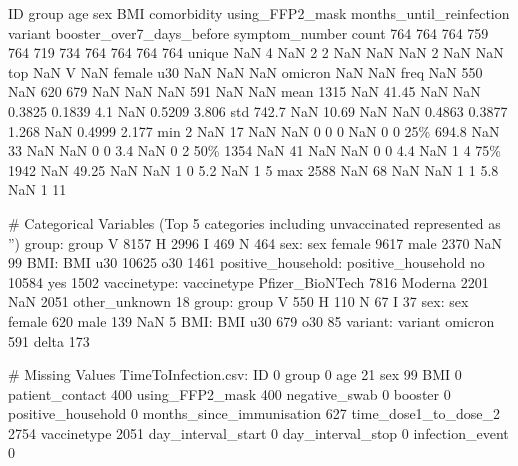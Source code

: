 \documentclass[11pt]{article}
\begin{document}
\begin{codeoutput}
          ID group   age     sex  BMI  comorbidity  using\_FFP2\_mask  months\_until\_reinfection  variant  booster\_over7\_days\_before  symptom\_number
count    764   764   764     759  764          719              734                       764      764                        764             764
unique   NaN     4   NaN       2    2          NaN              NaN                       NaN        2                        NaN             NaN
top      NaN     V   NaN  female  u30          NaN              NaN                       NaN  omicron                        NaN             NaN
freq     NaN   550   NaN     620  679          NaN              NaN                       NaN      591                        NaN             NaN
mean    1315   NaN 41.45     NaN  NaN       0.3825           0.1839                       4.1      NaN                     0.5209           3.806
std    742.7   NaN 10.69     NaN  NaN       0.4863           0.3877                     1.268      NaN                     0.4999           2.177
min        2   NaN    17     NaN  NaN            0                0                         0      NaN                          0               0
25\%    694.8   NaN    33     NaN  NaN            0                0                       3.4      NaN                          0               2
50\%     1354   NaN    41     NaN  NaN            0                0                       4.4      NaN                          1               4
75\%     1942   NaN 49.25     NaN  NaN            1                0                       5.2      NaN                          1               5
max     2588   NaN    68     NaN  NaN            1                1                       5.8      NaN                          1              11

\# Categorical Variables (Top 5 categories including unvaccinated represented as '')
group: group
V    8157
H    2996
I     469
N     464
sex: sex
female    9617
male      2370
NaN         99
BMI: BMI
u30    10625
o30     1461
positive\_household: positive\_household
no     10584
yes     1502
vaccinetype: vaccinetype
Pfizer\_BioNTech    7816
Moderna            2201
NaN                2051
other\_unknown        18
group: group
V    550
H    110
N     67
I     37
sex: sex
female    620
male      139
NaN         5
BMI: BMI
u30    679
o30     85
variant: variant
omicron    591
delta      173

\# Missing Values
TimeToInfection.csv: ID                              0
group                           0
age                            21
sex                            99
BMI                             0
patient\_contact               400
using\_FFP2\_mask               400
negative\_swab                   0
booster                         0
positive\_household              0
months\_since\_immunisation     627
time\_dose1\_to\_dose\_2         2754
vaccinetype                  2051
day\_interval\_start              0
day\_interval\_stop               0
infection\_event                 0


\end{codeoutput}
\end{document}
